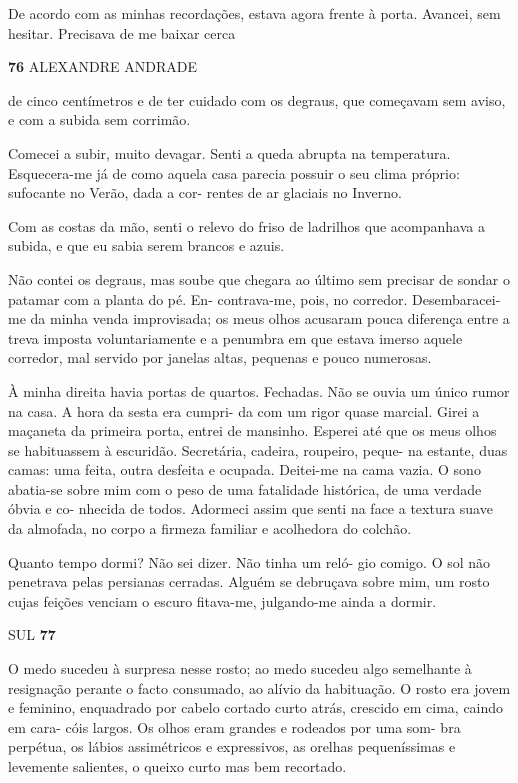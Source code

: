 De acordo com as minhas recordações, estava agora frente à porta.
Avancei, sem hesitar. Precisava de me baixar cerca

\textbf{76 }ALEXANDRE ANDRADE

de cinco centímetros e de ter cuidado com os degraus, que começavam sem
aviso, e com a subida sem corrimão.

Comecei a subir, muito devagar. Senti a queda abrupta na temperatura.
Esquecera-me já de como aquela casa parecia possuir o seu clima próprio:
sufocante no Verão, dada a cor- rentes de ar glaciais no Inverno.

Com as costas da mão, senti o relevo do friso de ladrilhos que
acompanhava a subida, e que eu sabia serem brancos e azuis.

Não contei os degraus, mas soube que chegara ao último sem precisar de
sondar o patamar com a planta do pé. En- contrava-me, pois, no corredor.
Desembaracei-me da minha venda improvisada; os meus olhos acusaram pouca
diferença entre a treva imposta voluntariamente e a penumbra em que
estava imerso aquele corredor, mal servido por janelas altas, pequenas e
pouco numerosas.

À minha direita havia portas de quartos. Fechadas. Não se ouvia um único
rumor na casa. A hora da sesta era cumpri- da com um rigor quase
marcial. Girei a maçaneta da primeira porta, entrei de mansinho. Esperei
até que os meus olhos se habituassem à escuridão. Secretária, cadeira,
roupeiro, peque- na estante, duas camas: uma feita, outra desfeita e
ocupada. Deitei-me na cama vazia. O sono abatia-se sobre mim com o peso
de uma fatalidade histórica, de uma verdade óbvia e co- nhecida de
todos. Adormeci assim que senti na face a textura suave da almofada, no
corpo a firmeza familiar e acolhedora do colchão.

Quanto tempo dormi? Não sei dizer. Não tinha um reló- gio comigo. O sol
não penetrava pelas persianas cerradas. Alguém se debruçava sobre mim,
um rosto cujas feições venciam o escuro fitava-me, julgando-me ainda a
dormir.

SUL \textbf{77}

O medo sucedeu à surpresa nesse rosto; ao medo sucedeu algo semelhante à
resignação perante o facto consumado, ao alívio da habituação. O rosto
era jovem e feminino, enquadrado por cabelo cortado curto atrás,
crescido em cima, caindo em cara- cóis largos. Os olhos eram grandes e
rodeados por uma som- bra perpétua, os lábios assimétricos e
expressivos, as orelhas pequeníssimas e levemente salientes, o queixo
curto mas bem recortado.

